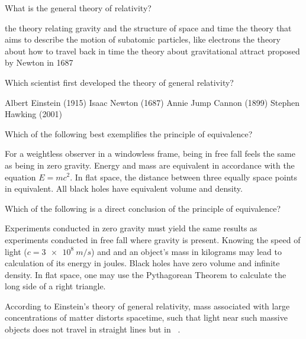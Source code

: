 \documentclass{exam}
\begin{document}
\begin{questions}

\question
What is the general theory of relativity?

\begin{randomizechoices}
    \correctchoice the theory relating gravity and the structure of space and time
    \choice the theory that aims to describe the motion of subatomic particles, like electrons
    \choice the theory about how to travel back in time
    \choice the theory about gravitational attract proposed by Newton in 1687
\end{randomizechoices}


\question
Which scientist first developed the theory of general relativity?

\begin{randomizechoices}
    \correctchoice Albert Einstein (1915)
    \choice Isaac Newton (1687)
    \choice Annie Jump Cannon (1899)
    \choice Stephen Hawking (2001)
\end{randomizechoices}

\question
Which of the following best exemplifies the principle of equivalence?

\begin{randomizechoices}
    \correctchoice For a weightless observer in a windowless frame, being in free fall feels the same as being in zero gravity.
    \choice Energy and mass are equivalent in accordance with the equation $E = mc^2$.
    \choice In flat space, the distance between three equally space points in equivalent.
    \choice All black holes have equivalent volume and density.
\end{randomizechoices}

\question
Which of the following is a direct conclusion of the principle of equivalence?

\begin{randomizechoices}
    \correctchoice Experiments conducted in zero gravity must yield the same results as experiments conducted in free fall where gravity is present.
    \choice Knowing the speed of light ($c=\SI{3e8}{m/s}$) and and an object's mass in kilograms may lead to calculation of its energy in joules.
    \choice Black holes have zero volume and infinite density.
    \choice In flat space, one may use the Pythagorean Theorem to calculate the long side of a right triangle.
\end{randomizechoices}

\question
According to Einstein's theory of general relativity, mass associated with large concentrations of matter distorts spacetime, such that light near such massive objects does not travel in straight lines but in \fillin\ .


\end{questions}
\end{document}
